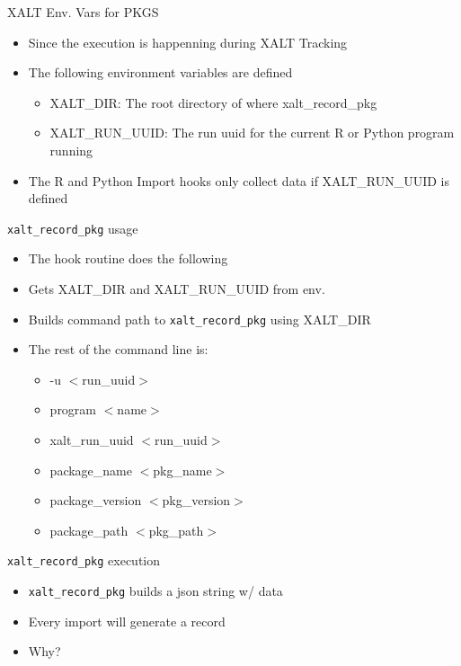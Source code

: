 \documentclass{beamer}
\begin{document}
\begin{frame}{XALT Env. Vars for PKGS}
  \begin{itemize}
    \item Since the execution is happenning during XALT Tracking
    \item The following environment variables are defined
      \begin{itemize}
        \item XALT\_DIR: The root directory of where xalt\_record\_pkg
        \item XALT\_RUN\_UUID: The run uuid for the current R or
          Python program running
      \end{itemize}
    \item The R and Python Import hooks only collect data if
      XALT\_RUN\_UUID is defined
  \end{itemize}
\end{frame}

\begin{frame}{\texttt{xalt\_record\_pkg} usage}
  \begin{itemize}
    \item The hook routine does the following
    \item Gets XALT\_DIR and XALT\_RUN\_UUID from env.
    \item Builds command path to \texttt{xalt\_record\_pkg} using
      XALT\_DIR
    \item The rest of the command line is:
      \begin{itemize}
        \item -u $<$run\_uuid$>$
        \item program $<$name$>$
        \item xalt\_run\_uuid $<$run\_uuid$>$
        \item package\_name $<$pkg\_name$>$
        \item package\_version $<$pkg\_version$>$
        \item package\_path $<$pkg\_path$>$
      \end{itemize}
  \end{itemize}
\end{frame}

\begin{frame}{\texttt{xalt\_record\_pkg} execution}
  \begin{itemize}
    \item \texttt{xalt\_record\_pkg} builds a json string w/ data
    \item Every import will generate a record
    \item Why?
  \end{itemize}
\end{frame}
\end{document}
